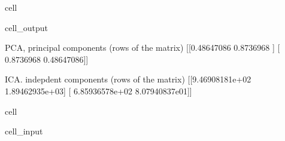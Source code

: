 \documentclass[letterpaper,10pt,italian]{jupyterBook}
\begin{document}
\begin{sphinxuseclass}{cell}
\begin{sphinxVerbatimOutput}
\begin{sphinxuseclass}{cell_output}
\begin{sphinxVerbatim}[commandchars=\\\{\}]
PCA, principal components (rows of the matrix)
[[\PYGZhy{}0.48647086 \PYGZhy{}0.8736968 ]
 [ 0.8736968  \PYGZhy{}0.48647086]]

ICA. indepdent components (rows of the matrix)
[[\PYGZhy{}9.46908181e+02 \PYGZhy{}1.89462935e+03]
 [ 6.85936578e+02 \PYGZhy{}8.07940837e\PYGZhy{}01]]
\end{sphinxVerbatim}

\end{sphinxuseclass}\end{sphinxVerbatimOutput}

\end{sphinxuseclass}
\begin{sphinxuseclass}{cell}\begin{sphinxVerbatimInput}

\begin{sphinxuseclass}{cell_input}
\begin{sphinxVerbatim}[commandchars=\\\{\}]
  
  

  \PYG{p}{[}     \PYG{p}{]}
  
   
  


\end{sphinxVerbatim}
\end{sphinxuseclass}
\end{sphinxVerbatimInput}
\end{sphinxuseclass}
\end{document}
